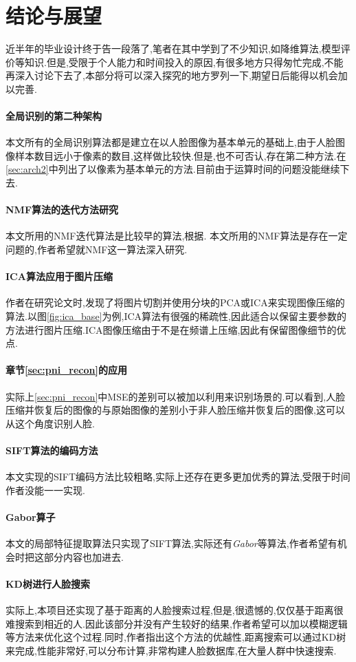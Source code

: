 \section{结论与展望}

近半年的毕业设计终于告一段落了,笔者在其中学到了不少知识,如降维算法,模型评价等知识.但是,受限于个人能力和时间投入的原因,有很多地方只得匆忙完成,不能再深入讨论下去了,本部分将可以深入探究的地方罗列一下,期望日后能得以机会加以完善.

\paragraph{全局识别的第二种架构}
本文所有的全局识别算法都是建立在以人脸图像为基本单元的基础上,由于人脸图像样本数目远小于像素的数目,这样做比较快.但是,也不可否认,存在第二种方法.在\ref{sec:arch2}中列出了以像素为基本单元的方法.目前由于运算时间的问题没能继续下去.

\paragraph{NMF算法的迭代方法研究}
本文所用的NMF迭代算法是比较早的算法,根据\cite{lin2007projected}. 本文所用的NMF算法是存在一定问题的,作者希望就NMF这一算法深入研究.

\paragraph{ICA算法应用于图片压缩}
作者在研究论文时,发现了将图片切割并使用分块的PCA或ICA来实现图像压缩的算法.以图\ref{fig:ica_base}为例,ICA算法有很强的稀疏性,因此适合以保留主要参数的方法进行图片压缩.ICA图像压缩由于不是在频谱上压缩,因此有保留图像细节的优点.

\paragraph{章节\ref{sec:pni_recon}的应用}
实际上\ref{sec:pni_recon}中MSE的差别可以被加以利用来识别场景的.可以看到,人脸压缩并恢复后的图像的与原始图像的差别小于非人脸压缩并恢复后的图像,这可以从这个角度识别人脸.

\paragraph{SIFT算法的编码方法}
本文实现的SIFT编码方法比较粗略,实际上还存在更多更加优秀的算法,受限于时间作者没能一一实现.

\paragraph{Gabor算子}
本文的局部特征提取算法只实现了SIFT算法,实际还有\textit{Gabor}等算法,作者希望有机会时把这部分内容也加进去.

\paragraph{KD树进行人脸搜索}
实际上,本项目还实现了基于距离的人脸搜索过程,但是,很遗憾的,仅仅基于距离很难搜索到相近的人.因此该部分并没有产生较好的结果,作者希望可以加以模糊逻辑等方法来优化这个过程.同时,作者指出这个方法的优越性,距离搜索可以通过KD树来完成,性能非常好,可以分布计算,非常构建人脸数据库,在大量人群中快速搜索.
